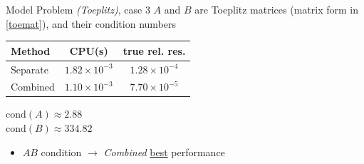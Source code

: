 \documentclass[aspectratio=169]{beamer}
\begin{document}
\begin{frame}{Model Problem \textit{(Toeplitz)}, case 3}
	$A$ and $B$ are Toeplitz matrices (matrix form in \eqref{toemat}), and their condition numbers

	\begin{minipage}[t]{0.63\textwidth}
		\vspace{0pt}
		\centering
		\begin{tabular}{l c c}
			\toprule
			Method & CPU(s) & true rel. res.\\
			\midrule
			Separate& $1.82 \times 10^{-3}$ & \alert{$1.28 \times 10^{-4}$} \\
			Combined& \underline{$1.10 \times 10^{-3}$}& \underline{$7.70 \times 10^{-5}$}\\
			\bottomrule
		\end{tabular}
	\end{minipage}%
	\hfill
	\begin{minipage}[t]{0.33\textwidth}
		\vspace{0pt}
		\underline{$\mathrm{cond} (A) \approx 2.88 $}\\
		$\mathrm{cond} (B) \approx 334.82$\\
	\end{minipage}

	\begin{itemize}
		\item $AB$  condition $\rightarrow$ \textit{Combined} \underline{best} performance
	\end{itemize}
\end{frame}
\end{document}
